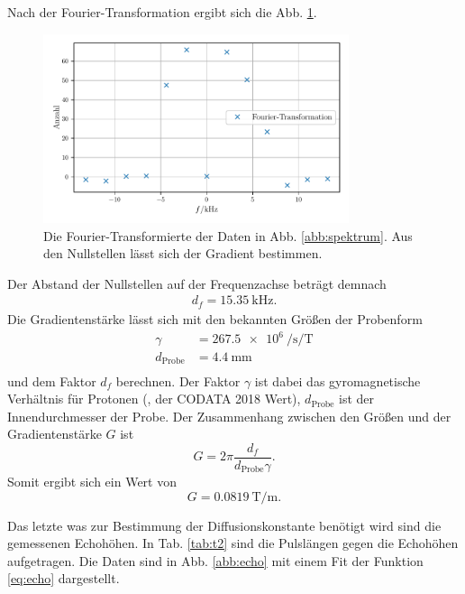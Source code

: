 Nach der Fourier-Transformation ergibt sich die Abb. \ref{abb:fourier}.
\begin{figure}
    \centering
    \includegraphics[width=0.8\textwidth]{plots/echo_gradient.pdf}
    \caption{Die Fourier-Transformierte der Daten in Abb. \ref{abb:spektrum}. Aus den Nullstellen lässt sich der Gradient bestimmen.}
    \label{abb:fourier}
\end{figure}
Der Abstand der Nullstellen auf der Frequenzachse beträgt demnach 
\begin{align*}
d_f = \SI{15.35}{\kilo\hertz}.
\end{align*} 
Die Gradientenstärke lässt sich mit den bekannten Größen der Probenform
\begin{align*}
    \gamma &= \SI{267.5e6}{\per\second\per\tesla} \\
    d_\text{Probe} &= \SI{4.4}{\milli\metre} \\ 
    \end{align*} 
und dem Faktor $d_f$ berechnen.
Der Faktor $\gamma$ ist dabei das gyromagnetische Verhältnis für Protonen (\cite{scipy}, der CODATA 2018 Wert), $d_\text{Probe}$ ist der Innendurchmesser der Probe.
Der Zusammenhang zwischen den Größen und der Gradientenstärke $G$ ist
\begin{equation*}
G = 2 \pi \frac{d_f}{d_\text{Probe} \gamma}.
\end{equation*}
Somit ergibt sich ein Wert von 
\begin{equation*}
G = \SI{0.0819}{\tesla\per\metre}.
\end{equation*}



Das letzte was zur Bestimmung der Diffusionskonstante benötigt wird sind die gemessenen Echohöhen. In Tab. \ref{tab:t2} sind die Pulslängen gegen die Echohöhen aufgetragen. Die Daten sind in Abb. \ref{abb:echo} mit einem Fit der Funktion \eqref{eq:echo} dargestellt. 

